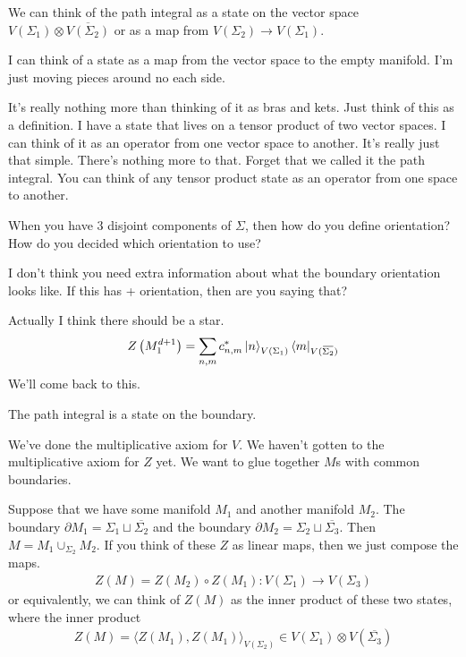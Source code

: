 We can think of the path integral as a state on the vector space
$V(\Sigma_1)\otimes\overbar{V(\Sigma_2)}$
or as a map from
$V(\Sigma_2)\to V(\Sigma_1)$.

I can think of a state as a map from the vector space to the empty manifold.
I'm just moving pieces around no each side.

It's really nothing more than thinking of it as bras and kets.
Just think of this as a definition.
I have a state that lives on a tensor product of two vector spaces.
I can think of it as an operator from one vector space to another.
It's really just that simple.
There's nothing more to that.
Forget that we called it the path integral.
You can think of any tensor product state as an operator from one space to
another.

\begin{question}
    When you have 3 disjoint components of $\Sigma$,
    then how do you define orientation?
    How do you decided which orientation to use?
\end{question}
I don't think you need extra information about what the boundary orientation
looks like.
If this has + orientation, then are you saying that?

Actually I think there should be a star.
\begin{align}
    Z\left( M_1^{d+1} \right)
    = \sum_{n,m} c_{n,m}^*
    \ket{n}_{V(\Sigma_1)}
    \bra{m}_{V(\overbar{\Sigma_2})}
\end{align}
We'll come back to this.

The path integral is a state on the boundary.

We've done the multiplicative axiom for $V$.
We haven't gotten to the multiplicative axiom for $Z$ yet.
We want to glue together $M$s with common boundaries.

Suppose that we have some manifold $M_1$
and another manifold $M_2$.
The boundary $\partial M_1 = \Sigma_1 \sqcup \overbar{\Sigma_2}$
and the boundary
$\partial M_2 = \Sigma_2 \sqcup \overbar{\Sigma_3}$.
Then $M=M_1 \cup_{\Sigma_2} M_2$.
If you think of these $Z$ as linear maps,
then we just compose the maps.
\begin{align}
    Z(M) = Z(M_2)\circ Z(M_1): V(\Sigma_1) \to V(\Sigma_3)
\end{align}
or equivalently,
we can think of $Z(M)$ as the inner product of these two states,
where the inner product
\begin{align}
    Z(M) =
    {\langle Z(M_1), Z(M_1) \rangle}_{V(\Sigma_2)}
    \in V(\Sigma_1) \otimes V(\overbar{\Sigma_3})
\end{align}

